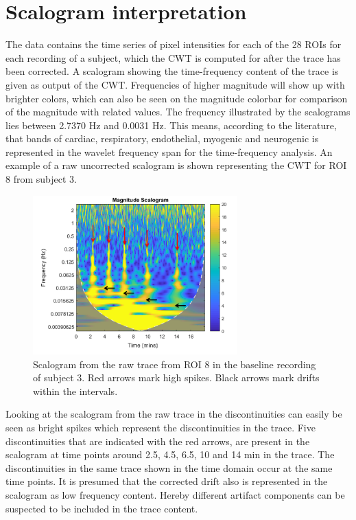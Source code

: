\section{Scalogram interpretation}
\label{sec:scalogram}
The data contains the time series of pixel intensities for each of the 28 ROIs for each recording of a subject, which the CWT is computed for after the trace has been corrected.  
A scalogram showing the time-frequency content of the trace is given as output of the CWT. Frequencies of higher magnitude will show up with brighter colors, which can also be seen on the magnitude colorbar for comparison of the magnitude with related values.
The frequency illustrated by the scalograms lies between 2.7370 Hz and 0.0031 Hz. This means, according to the literature, that bands of cardiac, respiratory, endothelial, myogenic and neurogenic is represented in the wavelet frequency span for the time-frequency analysis.\cite{geyer2004,sagaidachnyi2014}
An example of a raw uncorrected scalogram is shown  representing the CWT for ROI 8 from subject 3.

\begin{figure}[H]
	\includegraphics[width=0.7\textwidth]{figures/uncuffed_sub3_roi8_uncorr}
	\caption{Scalogram from the raw trace from ROI 8 in the baseline recording of subject 3. Red arrows mark high spikes. Black arrows mark drifts within the intervals.}
	\label{fig:scalogram_uncorr}
\end{figure}

Looking at the scalogram from the raw trace in  the discontinuities can easily be seen as bright spikes which represent the discontinuities in the trace. Five discontinuities that are indicated with the red arrows, are present in the scalogram at time points around 2.5, 4.5, 6.5, 10 and 14 min in the trace. The discontinuities in the same trace shown in the time domain occur at the same time points. It is presumed that the corrected drift also is represented in the scalogram as low frequency content. Hereby different artifact components can be suspected to be included in the trace content. 

